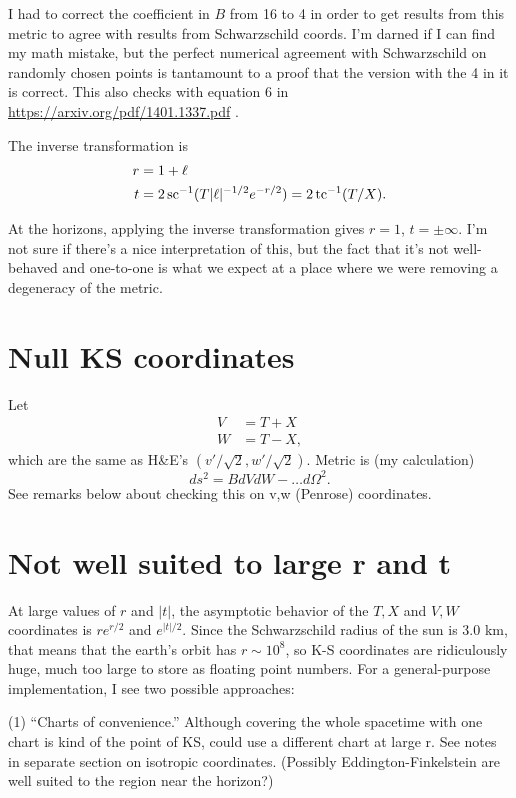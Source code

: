 \documentclass{article}
\begin{document}
I had to correct the coefficient in $B$ from 16 to 4
in order to get results from this metric to agree with results from Schwarzschild coords.
I'm darned if I can find my math mistake, but the perfect numerical agreement with
Schwarzschild on randomly chosen points is tantamount to a proof that the version with
the 4 in it is correct. This also checks with equation 6 in \url{https://arxiv.org/pdf/1401.1337.pdf} .

The inverse transformation is
\begin{align}
  r &= 1+\ell  \\
  t &= 2\operatorname{sc}^{-1}(T|\ell |^{-1/2}e^{-r/2}) = 2\operatorname{tc}^{-1}(T/X).
\end{align}

At the horizons, applying the inverse transformation gives $r=1$, $t=\pm\infty$. I'm not
sure if there's a nice interpretation of this, but the fact that it's not well-behaved
and one-to-one is what we expect at a place where we were removing a degeneracy of the metric.

\section{Null KS coordinates}

Let
\begin{align}
  V &= T+X\\
  W &= T-X,
\end{align}
which are the same as H\&E's $(v'/\sqrt2,w'/\sqrt2)$.
Metric is (my calculation)
\begin{equation}
  ds^2 = B dVdW-\ldots d\Omega^2.
\end{equation}
See remarks below about checking this on v,w (Penrose) coordinates.

\section{Not well suited to large r and t}

At large values of $r$ and $|t|$, the asymptotic behavior of the $T,X$ and $V,W$ coordinates
is $re^{r/2}$ and $e^{|t|/2}$. Since the Schwarzschild radius of the sun is 3.0 km, that means
that the earth's orbit has $r\sim 10^8$, so K-S coordinates are ridiculously huge, much too
large to store as floating point numbers. For a general-purpose implementation, I see two possible
approaches:

(1) ``Charts of convenience.'' Although covering the whole spacetime with one chart is kind of the point of KS,
could use a different chart at large r. See notes in separate section on isotropic coordinates.
(Possibly
Eddington-Finkelstein are well suited to the region near the horizon?)
\end{document}
